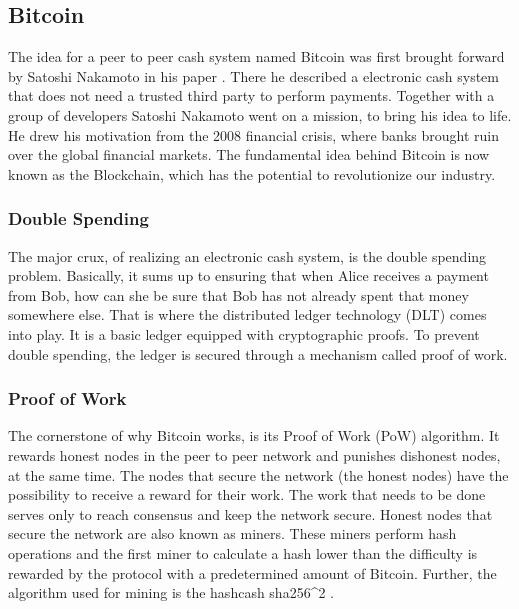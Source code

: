 \subsection{Bitcoin}

The idea for a peer to peer cash system named Bitcoin was first brought forward by Satoshi Nakamoto in his paper \cite{nakamoto2008bitcoin}. There he described a electronic cash system that does not need a trusted third party to perform payments. Together with a group of developers Satoshi Nakamoto went on a mission, to bring his idea to life. He drew his motivation from the 2008 financial crisis, where banks brought ruin over the global financial markets. The fundamental idea behind Bitcoin is now known as the Blockchain, which has the potential to revolutionize our industry.

\subsubsection{Double Spending}

The major crux, of realizing an electronic cash system, is the double spending problem. Basically, it sums up to ensuring that when Alice receives a payment from Bob, how can she be sure that Bob has not already spent that money somewhere else. That is where the distributed ledger technology (DLT) comes into play. It is a basic ledger equipped with cryptographic proofs. To prevent double spending, the ledger is secured through a mechanism called proof of work.

\subsubsection{Proof of Work} 

The cornerstone of why Bitcoin works, is its Proof of Work (PoW) algorithm. It rewards honest nodes in the peer to peer network and punishes dishonest nodes, at the same time. The nodes that secure the network (the honest nodes) have the possibility to receive a reward for their work. The work that needs to be done serves only to reach consensus and keep the network secure. Honest nodes that secure the network are also known as miners. These miners perform hash operations and the first miner to calculate a hash lower than the difficulty is rewarded by the protocol with a predetermined amount of Bitcoin. Further, the algorithm used for mining is the hashcash sha256^2 \cite{TODO}.  

